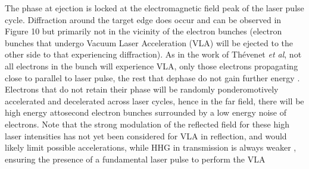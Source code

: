 The phase at ejection is locked at the electromagnetic field peak of the laser pulse cycle. Diffraction around the target edge does occur and can be observed in Figure 10 but primarily not in the vicinity of the electron bunches (electron bunches that undergo Vacuum Laser Acceleration (VLA) will be ejected to the other side to that experiencing diffraction). As in the work of Thévenet \textit{et al}, not all electrons in the bunch will experience VLA, only those electrons propagating close to parallel to laser pulse, the rest that dephase do not gain further energy \cite{Thevenet2016}. Electrons that do not retain their phase will be randomly ponderomotively accelerated and decelerated across laser cycles, hence in the far field, there will be high energy attosecond electron bunches surrounded by a low energy noise of electrons. Note that the strong modulation of the reflected field for these high laser intensities has not yet been considered for VLA in reflection, and would likely limit possible accelerations, while HHG in transmission is always weaker \cite{cousens2020}, ensuring the presence of a fundamental laser pulse to perform the VLA

